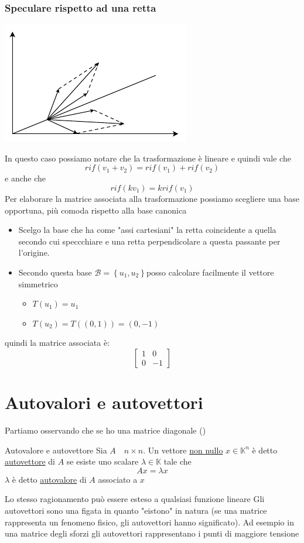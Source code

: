 \subsubsection*{Speculare rispetto ad una retta}
\begin{center}
	\includegraphics{Images/Speculare.pdf}
\end{center}
In questo caso possiamo notare che la trasformazione è lineare e quindi vale che
\[
	rif\left( v_1+v_2 \right) = rif\left( v_1 \right) + rif \left( v_2 \right)
\]
e anche che
\[
	rif\left( kv_1 \right) = k rif\left( v_1 \right)
\]
Per elaborare la matrice associata alla trasformazione possiamo scegliere una base opportuna, più comoda rispetto alla base canonica
\begin{itemize}
	\item Scelgo la base che ha come "assi cartesiani" la retta coincidente a quella secondo cui speccchiare e una retta perpendicolare a questa passante per l'origine.
	\item Secondo questa base $ \mathcal{B} = \left\{ u_1,u_2 \right\}  $posso calcolare facilmente il vettore simmetrico
	      \begin{itemize}
		      \item $ T\left( u_1 \right) = u_1  $
		      \item $ T\left( u_2 \right) = T\left( \left( 0,1 \right)  \right)  = \left( 0,-1 \right) $
	      \end{itemize}
\end{itemize}
quindi la matrice associata è:
\[
	\begin{bmatrix}
		1 & 0  \\
		0 & -1
	\end{bmatrix}
\]

\section{Autovalori e autovettori}
Partiamo osservando che se ho una matrice diagonale ()
\begin{definizione}{Autovalore e autovettore}
	Sia $ A \quad n \times n $. Un vettore \underline{non nullo} $ x \in  \mathbb{K}^{n} $ è detto \underline{autovettore} di $ A $ se esiste uno scalare $ \lambda \in \mathbb{K} $ tale che
	\[
		Ax = \lambda  x
	\]
	$ \lambda  $ è detto \underline{autovalore} di $ A $ associato a $ x $
\end{definizione}
Lo stesso ragionamento può essere esteso a qualsiasi funzione lineare
\vskip3mm
Gli autovettori sono una figata in quanto "eistono" in natura (se una matrice rappresenta un fenomeno fisico, gli autovettori hanno significato). Ad esempio in una matrice degli sforzi gli autovettori rappresentano i punti di maggiore tensione

